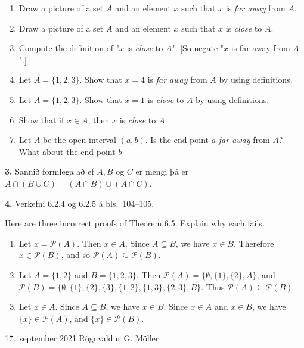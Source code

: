 \documentclass[12pt]{article}
\begin{document}
\begin{enumerate}[label=(\alph*),itemsep=0pt]
	\item Draw a  picture of a set $A$ and an element $x$ such that $x$ is \emph{far away} from $A$.
	\item Draw a  picture of a set $A$ and an element $x$ such that $x$ is \emph{close} to $A$.
	\item Compute the definition of "$x$ is \emph{close} to $A$". [So negate "$x$ is far away from $A$".]
	\item Let $A=\{ 1,2,3\} $. Show that $x=4$ is \emph{far away} from $A$ by using definitions.
	\item Let $A=\{ 1,2,3\} $. Show that $x=1$ is \emph{close} to $A$ by using definitions.
	\item Show that if $x\in A$, then $x$ is \emph{close} to $A$.
	\item Let $A$ be the open interval $(a,b)$. Is the end-point $a$ \emph{far away} from $A$? What about the end point $b$
\end{enumerate}

\smallskip

{\bf 3.}  Sannið formlega að ef $A, B$ og $C$ er mengi þá er $A\cap (B\cup C)=(A\cap B)\cup (A\cap C)$.

\smallskip

{\bf 4.}  Verkefni 6.2.4 og 6.2.5 á bls.~104--105.

Here are three incorrect proofs of Theorem 6.5. Explain why each fails.

\begin{enumerate}[label=(\alph*),itemsep=0pt]
	\item Let $x=\mathcal{P} (A)$. Then $x\in A$. Since $A\subseteq B$, we have $x\in B$. Therefore $x\in \mathcal{P} (B)$, and so $\mathcal{P} (A) \subseteq \mathcal{P} (B)$.
	\item Let $A=\{ 1,2\} $ and $B=\{ 1,2,3\} $. Then $\mathcal{P}(A)=\{ \emptyset , \{ 1\} ,\{ 2\} ,A\} $, and $\mathcal{P}(B)=\{ \emptyset ,\{ 1\} ,\{ 2\} ,\{ 3\} ,\{ 1,2\} ,\{ 1,3\} ,\{ 2,3\} ,B\} $. Thus $\mathcal{P}(A)\subseteq \mathcal{P}(B)$.
	\item Let $x\in A$. Since $A\subseteq B$, we have $x\in B$. Since $x\in A$ and $x\in B$, we have $\{ x\} \in \mathcal{P}(A)$, and $\{ x\} \in \mathcal{P}(B)$.
\end{enumerate}

\vfill  17.~september 2021
\hfill  Rögnvaldur G. Möller
\end{document}
